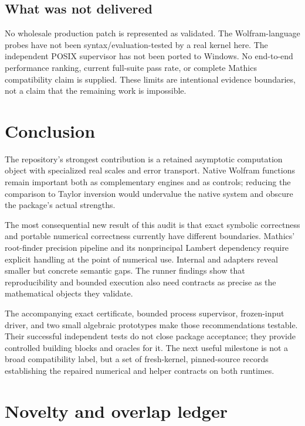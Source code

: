 \documentclass[11pt,letterpaper]{article}
\newcommand{\code}[1]{\texttt{\detokenize{#1}}}
\begin{document}
\subsection{What was not delivered}

No wholesale production patch is represented as validated. The Wolfram-language probes have not been syntax/evaluation-tested by a real kernel here. The independent POSIX supervisor has not been ported to Windows. No end-to-end performance ranking, current full-suite pass rate, or complete Mathics compatibility claim is supplied. These limits are intentional evidence boundaries, not a claim that the remaining work is impossible.

\section{Conclusion}

The repository's strongest contribution is a retained asymptotic computation object with specialized real scales and error transport. Native Wolfram functions remain important both as complementary engines and as controls; reducing the comparison to Taylor inversion would undervalue the native system and obscure the package's actual strengths.

The most consequential new result of this audit is that exact symbolic correctness and portable numerical correctness currently have different boundaries. Mathics' root-finder precision pipeline and its nonprincipal Lambert dependency require explicit handling at the point of numerical use. Internal \code{Limit} and \code{FirstPosition} adapters reveal smaller but concrete semantic gaps. The runner findings show that reproducibility and bounded execution also need contracts as precise as the mathematical objects they validate.

The accompanying exact certificate, bounded process supervisor, frozen-input driver, and two small algebraic prototypes make those recommendations testable. Their successful independent tests do not close package acceptance; they provide controlled building blocks and oracles for it. The next useful milestone is not a broad compatibility label, but a set of fresh-kernel, pinned-source records establishing the repaired numerical and helper contracts on both runtimes.

\appendix
\section{Novelty and overlap ledger}\label{app:novelty}
\end{document}
